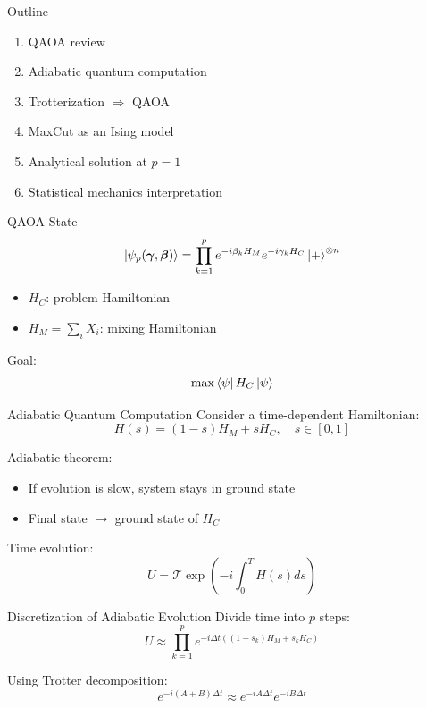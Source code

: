 \documentclass{beamer}
\begin{document}

\frame{\titlepage}

\begin{frame}{Outline}
\begin{enumerate}
\item QAOA review
\item Adiabatic quantum computation
\item Trotterization $\Rightarrow$ QAOA
\item MaxCut as an Ising model
\item Analytical solution at $p=1$
\item Statistical mechanics interpretation
\end{enumerate}
\end{frame}

\begin{frame}{QAOA State}
\[
\ket{\psi_p(\boldsymbol{\gamma},\boldsymbol{\beta})}
=
\prod_{k=1}^p e^{-i\beta_k H_M} e^{-i\gamma_k H_C}
\ket{+}^{\otimes n}
\]

\begin{itemize}
\item $H_C$: problem Hamiltonian
\item $H_M = \sum_i X_i$: mixing Hamiltonian
\end{itemize}

Goal:
\[
\max \bra{\psi} H_C \ket{\psi}
\]
\end{frame}

\begin{frame}{Adiabatic Quantum Computation}
Consider a time-dependent Hamiltonian:
\[
H(s) = (1-s)H_M + s H_C, \quad s \in [0,1]
\]

Adiabatic theorem:
\begin{itemize}
\item If evolution is slow, system stays in ground state
\item Final state $\rightarrow$ ground state of $H_C$
\end{itemize}

Time evolution:
\[
U = \mathcal{T}\exp\left(-i\int_0^T H(s) ds\right)
\]
\end{frame}

\begin{frame}{Discretization of Adiabatic Evolution}
Divide time into $p$ steps:
\[
U \approx \prod_{k=1}^p
e^{-i \Delta t ((1-s_k)H_M + s_k H_C)}
\]

Using Trotter decomposition:
\[
e^{-i (A+B)\Delta t}
\approx
e^{-iA\Delta t} e^{-iB\Delta t}
\]
\end{frame}
\end{document}
